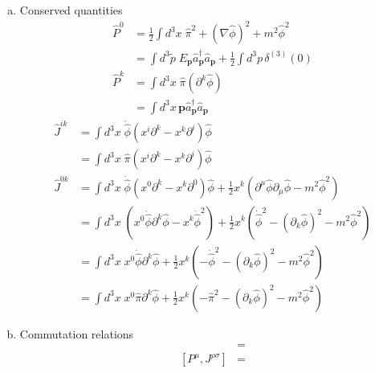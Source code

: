 \documentclass[10pt,a4paper]{report}
\theoremstyle{definition}
\begin{document}
\begin{enumerate}[a)]
\item Conserved quantities
\begin{align}
\hat{P}^0
&=\frac{1}{2}\int d^3x\;\hat{\pi}^2+(\nabla\hat{\phi})^2+m^2\hat{\phi}^2\\
&=\int d^3\tilde{p}\;E_\mathbf{p}
\hat{a}^\dagger_\mathbf{p}\hat{a}_\mathbf{p}
+\frac{1}{2}\int d^3p\,\delta^{(3)}(0)\\
\hat{P}^k
&=\int d^3x\;\hat{\pi}(\partial^k\hat{\phi})\\
&=\int d^3x\, \mathbf{p}\hat{a}_\mathbf{p}^\dagger \hat{a}_\mathbf{p}
\end{align}
\begin{align}
\hat{J}^{ik}
&=\int d^3x\;\dot{\hat{\phi}}(x^i\partial^k-x^k\partial^i)\hat{\phi}\\
&=\int d^3x\;\hat{\pi}(x^i\partial^k-x^k\partial^i)\hat{\phi}\\
\hat{J}^{0k}
&=\int d^3x\;\dot{\hat{\phi}}(x^0\partial^k-x^k\partial^0)\hat{\phi}+\frac{1}{2}x^k(\partial^\mu\hat{\phi}\partial_\mu\hat{\phi}-m^2\hat{\phi}^2)\\
&=\int d^3x\;(x^0\dot{\hat{\phi}}\partial^k\hat{\phi}-x^k\dot{\hat{\phi}}^2)+\frac{1}{2}x^k(\dot{\hat\phi}^2-(\partial_k\hat{\phi})^2-m^2\hat{\phi}^2)\\
&=\int d^3x\;x^0\dot{\hat{\phi}}\partial^k\hat{\phi}+\frac{1}{2}x^k(-\dot{\hat\phi}^2-(\partial_k\hat{\phi})^2-m^2\hat{\phi}^2)\\
&=\int d^3x\;x^0\hat{\pi}\partial^k\hat{\phi}+\frac{1}{2}x^k(-\hat{\pi}^2-(\partial_k\hat{\phi})^2-m^2\hat{\phi}^2)
\end{align}

\item Commutation relations
\begin{align}
[P^\mu,P^\nu]&=\\
[P^\mu,J^{\rho\sigma}]&=
\end{align}


\end{enumerate}
\end{document}
